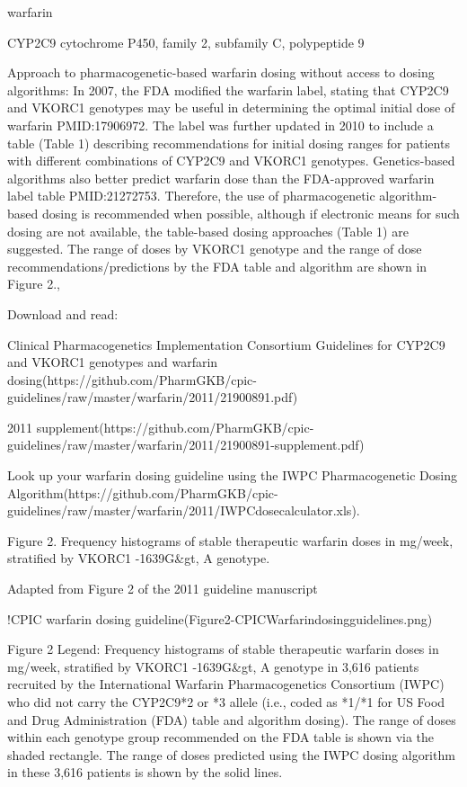 \documentclass{resume} %
\begin{document}
\begin{rSection}{ warfarin }
\begin{rSubsection}{ CYP2C9 }{ cytochrome P450, family 2, subfamily C, polypeptide 9 }{}{}
 \newline
\item Approach to pharmacogenetic-based warfarin dosing without access to dosing algorithms:     In 2007, the FDA modified the warfarin label, stating that CYP2C9 and VKORC1 genotypes may be useful in determining the optimal initial dose of warfarin PMID:17906972. The label was further updated in 2010 to include a table (Table 1) describing recommendations for initial dosing ranges for patients with different combinations of CYP2C9 and VKORC1 genotypes. Genetics-based algorithms also better predict warfarin dose than the FDA-approved warfarin label table PMID:21272753. Therefore, the use of pharmacogenetic algorithm-based dosing is recommended when possible, although if electronic means for such dosing are not available, the table-based dosing approaches (Table 1) are suggested. The range of doses by VKORC1 genotype and the range of dose recommendations/predictions by the FDA table and algorithm are shown in Figure 2., 
 \newline
\item Download and read: 
 \newline
\item Clinical Pharmacogenetics Implementation Consortium Guidelines for CYP2C9 and VKORC1 genotypes and warfarin dosing(https://github.com/PharmGKB/cpic-guidelines/raw/master/warfarin/2011/21900891.pdf)
 \newline
\item 2011 supplement(https://github.com/PharmGKB/cpic-guidelines/raw/master/warfarin/2011/21900891-supplement.pdf)
 \newline
\item Look up your warfarin dosing guideline using the IWPC Pharmacogenetic Dosing Algorithm(https://github.com/PharmGKB/cpic-guidelines/raw/master/warfarin/2011/IWPCdosecalculator.xls).
 \newline
\item Figure 2. Frequency histograms of stable therapeutic warfarin doses in mg/week, stratified by VKORC1 -1639G&gt, A genotype.
 \newline
\item Adapted from Figure 2 of the 2011 guideline manuscript
 \newline
\item !CPIC warfarin dosing guideline(Figure2-CPICWarfarindosingguidelines.png)
 \newline
\item Figure 2 Legend: Frequency histograms of stable therapeutic warfarin doses in mg/week, stratified by VKORC1 -1639G&gt, A genotype in 3,616 patients recruited by the International Warfarin Pharmacogenetics Consortium (IWPC) who did not carry the CYP2C9*2 or *3 allele (i.e., coded as *1/*1 for US Food and Drug Administration (FDA) table and algorithm dosing). The range of doses within each genotype group recommended on the FDA table is shown via the shaded rectangle. The range of doses predicted using the IWPC dosing algorithm in these 3,616 patients is shown by the solid lines.

\end{rSubsection}
\end{rSection}
\end{document}
